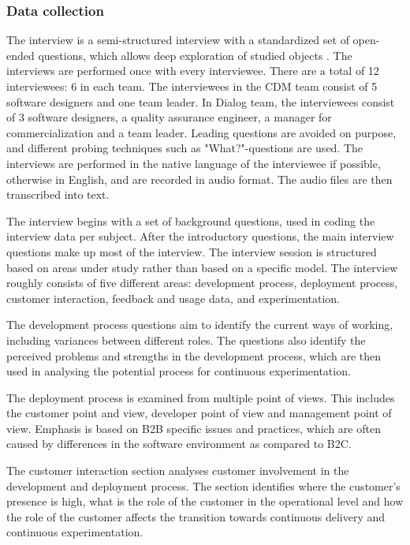 \documentclass[english]{tktltiki2}
\theoremstyle{definition}
\theoremstyle{remark}
\begin{document}
\subsubsection{Data collection} %
The interview is a semi-structured interview with a standardized set of open-ended questions, which allows deep exploration of studied objects \cite{runeson2009guidelines}. The interviews are performed once with every interviewee. There are a total of 12 interviewees: 6 in each team. The interviewees in the CDM team consist of 5 software designers and one team leader. In Dialog team, the interviewees consist of 3 software designers, a quality assurance engineer, a manager for commercialization and a team leader. Leading questions are avoided on purpose, and different probing techniques such as "What?"-questions are used. The interviews are performed in the native language of the interviewee if possible, otherwise in English, and are recorded in audio format. The audio files are then transcribed into text.

The interview begins with a set of background questions, used in coding the interview data per subject. After the introductory questions, the main interview questions make up most of the interview. The interview session is structured based on areas under study rather than based on a specific model. The interview roughly consists of five different areas: development process, deployment process, customer interaction, feedback and usage data, and experimentation.

The development process questions aim to identify the current ways of working, including variances between different roles. The questions also identify the perceived problems and strengths in the development process, which are then used in analysing the potential process for continuous experimentation. 

The deployment process is examined from multiple point of views. This includes the customer point and view, developer point of view and management point of view. Emphasis is based on B2B specific issues and practices, which are often caused by differences in the software environment as compared to B2C.  

The customer interaction section analyses customer involvement in the development and deployment process. The section identifies where the customer's presence is high, what is the role of the customer in the operational level and how the role of the customer affects the transition towards continuous delivery and continuous experimentation. 
\end{document}
